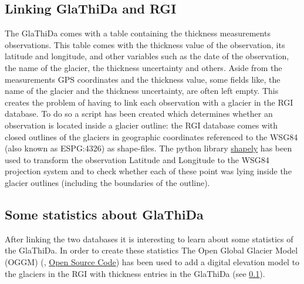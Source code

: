 \subsection{Linking GlaThiDa and RGI}\label{GlaRGI}
The GlaThiDa comes with a table containing the thickness measurements observations. This table comes with the thickness value of the observation, its latitude and longitude, and other variables such as the date of the observation, the name of the glacier, the thickness uncertainty and others. Aside from the measurements GPS coordinates and the thickness value, some fields like, the name of the glacier and the thickness uncertainty, are often left empty. This creates the problem of having to link each observation with a glacier in the RGI database. To do so a script has been created which determines whether an observation is located inside a glacier outline: the RGI database comes with closed outlines of the glaciers in geographic coordinates referenced to the WSG84 (also known as ESPG:4326) as shape-files. The python library \href{https://github.com/Toblerity/Shapely}{shapely} has been used to transform the observation Latitude and Longitude to the WSG84 projection system and to check whether each of these point was lying inside the glacier outlines (including the boundaries of the outline).

\subsection{Some statistics about GlaThiDa}
After linking the two databases it is interesting to learn about some statistics of the GlaThiDa. In order to create these statistics The Open Global Glacier Model (OGGM) (\citet{OGGM2019}, \href{https://github.com/OGGM/oggm}{Open Source Code}) has been used to add a digital elevation model to the glaciers in the RGI with thickness entries in the GlaThiDa (see \ref{GlaRGI}).

